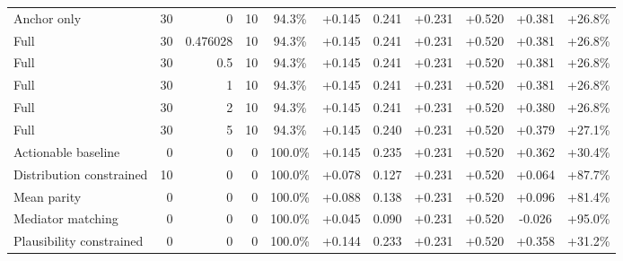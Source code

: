 \begin{table}[htbp]
\begin{tabular}{lrrrccccccc}
Anchor only & 30 & 0 & 10 & 94.3\% & +0.145 & 0.241 & +0.231 & +0.520 & +0.381 & +26.8\% \\
Full & 30 & 0.476028 & 10 & 94.3\% & +0.145 & 0.241 & +0.231 & +0.520 & +0.381 & +26.8\% \\
Full & 30 & 0.5 & 10 & 94.3\% & +0.145 & 0.241 & +0.231 & +0.520 & +0.381 & +26.8\% \\
Full & 30 & 1 & 10 & 94.3\% & +0.145 & 0.241 & +0.231 & +0.520 & +0.381 & +26.8\% \\
Full & 30 & 2 & 10 & 94.3\% & +0.145 & 0.241 & +0.231 & +0.520 & +0.380 & +26.8\% \\
Full & 30 & 5 & 10 & 94.3\% & +0.145 & 0.240 & +0.231 & +0.520 & +0.379 & +27.1\% \\
Actionable baseline & 0 & 0 & 0 & 100.0\% & +0.145 & 0.235 & +0.231 & +0.520 & +0.362 & +30.4\% \\
Distribution constrained & 10 & 0 & 0 & 100.0\% & +0.078 & 0.127 & +0.231 & +0.520 & +0.064 & +87.7\% \\
Mean parity & 0 & 0 & 0 & 100.0\% & +0.088 & 0.138 & +0.231 & +0.520 & +0.096 & +81.4\% \\
Mediator matching & 0 & 0 & 0 & 100.0\% & +0.045 & 0.090 & +0.231 & +0.520 & -0.026 & +95.0\% \\
Plausibility constrained & 0 & 0 & 0 & 100.0\% & +0.144 & 0.233 & +0.231 & +0.520 & +0.358 & +31.2\% \\
\bottomrule
\end{tabular}
\end{table}